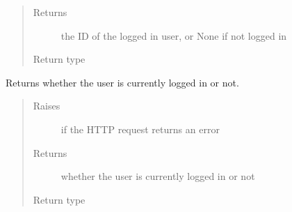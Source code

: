 \documentclass[letterpaper,10pt,english]{sphinxmanual}
\begin{document}
\begin{fulllineitems}
\begin{fulllineitems}
\begin{quote}
\begin{description}
\item[{Returns}] \leavevmode
the ID of the logged in user, or None if not logged in

\item[{Return type}] \leavevmode
{}

\end{description}\end{quote}

\end{fulllineitems}


\begin{fulllineitems}
\label{\detokenize{autoapi/pine/client/client/index:pine.client.client.PineClient.is_logged_in}}
Returns whether the user is currently logged in or not.
\begin{quote}\begin{description}
\item[{Raises}] \leavevmode
{\hyperref[\detokenize{autoapi/pine/client/exceptions/index:pine.client.exceptions.PineClientHttpException}]{}} \textendash{} if the HTTP request returns an error

\item[{Returns}] \leavevmode
whether the user is currently logged in or not

\item[{Return type}] \leavevmode
{}

\end{description}\end{quote}

\end{fulllineitems}



\end{fulllineitems}
\end{document}
